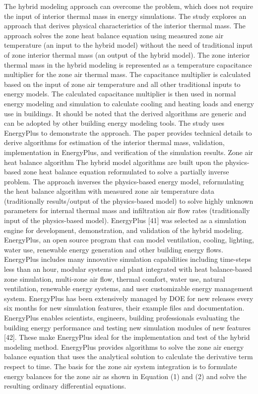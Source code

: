 The hybrid modeling approach can overcome the problem, which does not require the input of interior thermal mass in energy simulations. The study explores an approach that derives physical characteristics of the interior thermal mass. The approach solves the zone heat balance equation using measured zone air temperature (an input to the hybrid model) without the need of traditional input of zone interior thermal mass (an output of the hybrid model). The zone interior thermal mass in the hybrid modeling is represented as a temperature capacitance multiplier for the zone air thermal mass. The capacitance multiplier is calculated based on the input of zone air temperature and all other traditional inputs to energy models. The calculated capacitance multiplier is then used in normal energy modeling and simulation to calculate cooling and heating loads and energy use in buildings. It should be noted that the derived algorithms are generic and can be adopted by other building energy modeling tools. The study uses EnergyPlus to demonstrate the approach. The paper provides technical details to derive algorithms for estimation of the interior thermal mass, validation, implementation in EnergyPlus, and verification of the simulation results.
	Zone air heat balance algorithm
The hybrid model algorithms are built upon the physics-based zone heat balance equation reformulated to solve a partially inverse problem. The approach inverses the physics-based energy model, reformulating the heat balance algorithm with measured zone air temperature data (traditionally results/output of the physics-based model) to solve highly unknown parameters for internal thermal mass and infiltration air flow rates (traditionally input of the physics-based model). 
EnergyPlus [41] was selected as a simulation engine for development, demonstration, and validation of the hybrid modeling. EnergyPlus, an open source program that can model ventilation, cooling, lighting, water use, renewable energy generation and other building energy flows. EnergyPlus includes many innovative simulation capabilities including time-steps less than an hour, modular systems and plant integrated with heat balance-based zone simulation, multi-zone air flow, thermal comfort, water use, natural ventilation, renewable energy systems, and user customizable energy management system. EnergyPlus has been extensively managed by DOE for new releases every six months for new simulation features, their example files and documentation. EnergyPlus enables scientists, engineers, building professionals evaluating the building energy performance and testing new simulation modules of new features [42]. These make EnergyPlus ideal for the implementation and test of the hybrid modeling method. 
EnergyPlus provides algorithms to solve the zone air energy balance equation that uses the analytical solution to calculate the derivative term respect to time. The basis for the zone air system integration is to formulate energy balances for the zone air as shown in Equation (1) and (2) and solve the resulting ordinary differential equations. 

